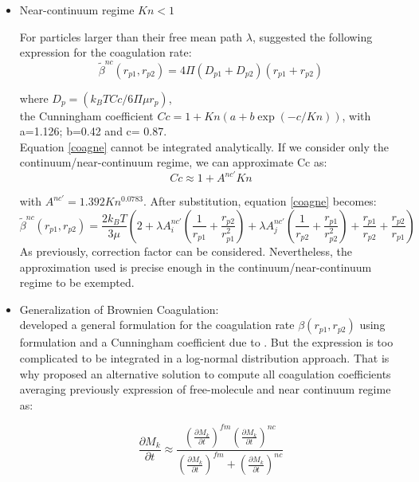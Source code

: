 \begin{itemize}
\item Near-continuum regime $Kn < 1$

For particles larger than their free mean path $\lambda$, \citet{Friedlander-1977} suggested
the following  expression for the coagulation rate:
\begin{equation}
\widetilde{\beta}^{nc}(r_{p1},r_{p2}) = 4 \Pi (D_{p1} + D_{p2}) (r_{p1} + 
r_{p2})
\label{coagne}
\end{equation}

where $D_{p} = (k_B T Cc / 6 \Pi \mu r_p)$,\\
the Cunningham coefficient $Cc=1 + 
Kn(a+b \exp(-c/Kn))$, with  a=1.126; b=0.42 and c= 0.87. \\
Equation \ref{coagne} cannot be integrated analytically. If we consider only the 
continuum/near-continuum regime, we can approximate Cc as:
\begin{equation}
Cc \approx 1 + A^{nc'} Kn
\label{Cc}
\end{equation}

with $ A^{nc'} = 1.392 Kn^{0.0783}$. After substitution, equation \ref{coagne} 
becomes:
\begin{equation}
\widetilde{\beta}^{nc}(r_{p1},r_{p2}) = \frac{2 k_B T}{3 \mu}\left(2+\lambda 
A^{nc'}_i 
\left(\frac{1}{r_{p1}} + \frac{r_{p2}}{r_{p1}^2}\right) + \lambda A^{nc'}_j 
\left(\frac{1}{r_{p2}} + \frac{r_{p1}}{r_{p2}^2}\right) + \frac{r_{p1}}{r_{p2}}
+ \frac{r_{p2}}{r_{p1}}\right)
\label{coagne_cor}
\end{equation}
As previously, correction factor can be considered. Nevertheless, the 
approximation used is
precise enough in the continuum/near-continuum regime to be exempted.

\item Generalization of Brownien Coagulation:\\
\citet{Seinfeld-1997} developed a general formulation for the coagulation rate $
\beta(r_{p1},r_{p2})$ using \citet{Fuchs-1964} formulation and a Cunningham 
coefficient
due to \citet{Philips-1975}. But the expression is too complicated to be 
integrated in
a log-normal distribution approach.
That is why \citet{Whitby-1991} proposed an alternative solution to compute all 
coagulation coefficients averaging previously expression of free-molecule and 
near continuum regime as:

\begin{equation}
\frac{\partial M_k}{\partial t}  \approx \frac{ (\frac{\partial M_k}{\partial 
t})^{fm} (\frac{\partial M_k}{\partial t})^{nc}}
{(\frac{\partial M_k}{\partial t})^{fm} +  (\frac{\partial M_k}{\partial 
t})^{nc}}
\label{coag_betafm}
\end{equation}

\end{itemize}

